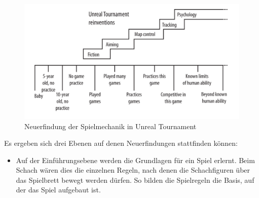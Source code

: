 \begin{description}



\begin{figure}[H]
    \centering
    \includegraphics[width=.8\textwidth]{files/games/utSkill}
    \caption{Neuerfindung der Spielmechanik in Unreal Tournament \cite[S. 70]{Adams:1515529}}
    \label{pic:ut}
\end{figure}


Es ergeben sich drei Ebenen auf denen Neuerfindungen stattfinden können: 
\begin{itemize}
\item Auf der Einführungsebene werden die Grundlagen für ein Spiel erlernt. Beim Schach wären dies die einzelnen Regeln, nach denen die Schachfiguren über das Spielbrett bewegt werden dürfen. So bilden die Spielregeln die Basis, auf der das Spiel aufgebaut ist.


\end{itemize}
\end{description}
